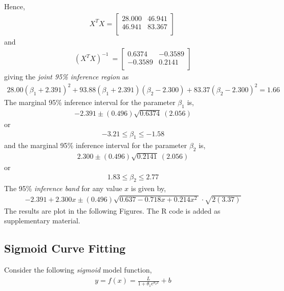 \documentclass[11pt,a4paper]{article}
\begin{document}
Hence,
\begin{align}X^{T}X = \begin{bmatrix}
28.000 & 46.941 \\
46.941 & 83.367 \\
\end{bmatrix}\ \end{align}
and
\begin{align}\left( X^{T}X \right)^{- 1}\  = 
\begin{bmatrix}
0.6374 & - 0.3589 \\
 - 0.3589 & 0.2141 \\
\end{bmatrix}
\end{align}
giving the \emph{joint 95\% inference region} as
\begin{align}
28.00\left( \beta_{1} + 2.391 \right)^{2} + 93.88\left( \beta_{1} + 2.391 \right)\left( \beta_{2} - 2.300 \right) + 83.37\left( \beta_{2} - 2.300 \right)^{2} = 1.66
\end{align}
The marginal 95\% inference interval for the parameter \(\beta_{1}\) is,
\begin{align}
- 2.391 \pm (0.496)\sqrt{0.6374}\ (2.056)
\end{align}
or
\begin{align} 
-3.21 \leq \beta_{1} \leq - 1.58
\end{align}
and the marginal 95\% inference interval for the parameter \(\beta_{2}\)
is,
\begin{align}
2.300 \pm (0.496)\sqrt{0.2141}\ (2.056)
\end{align}
or
\begin{align}
1.83 \leq \beta_{2} \leq 2.77
\end{align}
The 95\% \emph{inference band} for any value \(x\) is given by,
\begin{align}
- 2.391 + 2.300x \pm (0.496)\sqrt{0.637 - 0.718x + 0.214x^{2}\ } \cdot \sqrt{2(3.37)}
\end{align}
The results are plot in the following Figures.
The R code is added as supplementary material.

\subsection{Sigmoid Curve Fitting}

Consider the following \emph{sigmoid} model function,
\begin{align}
y = f(x) = \frac{L}{1 + \theta_{1}e^{\theta_{2}x}} + b
\end{align}
\end{document}
